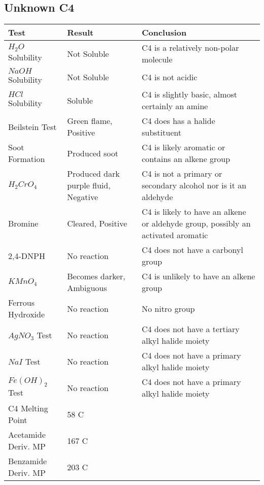 \documentclass[11pt]{article}
\begin{document}
	\subsection{Unknown C4}
	\begin{table}[h]
		\raggedright
		\begin{tabular}{ l  p{3.0cm} p{5.4cm} } 
			\toprule
			\textbf{Test} & \textbf{Result} & \textbf{Conclusion} \\\midrule
			
			$H_2O$ Solubility & Not Soluble & C4 is a relatively non-polar molecule \\\hline
			
			$NaOH$ Solubility & Not Soluble & C4 is not acidic \\\hline
			
			$HCl$ Solubility & Soluble & C4 is slightly basic, almost certainly an amine \\\hline
			
			Beilstein Test & Green flame, Positive & C4 does has a halide substituent \\\hline
			
			Soot Formation & Produced soot & C4 is likely aromatic or contains an alkene group \\\hline
			
			$H_2CrO_4$ & Produced dark purple fluid, Negative & C4 is not a primary or secondary alcohol nor is it an aldehyde \\\hline
			
			Bromine & Cleared, Positive & C4 is likely to have an alkene or aldehyde group, possibly an activated aromatic \\\hline 
			
			2,4-DNPH & No reaction & C4 does not have a carbonyl group \\\hline 
			
			$KMnO_4$ & Becomes darker, Ambiguous & C4 is unlikely to have an alkene group \\\hline  
			
			Ferrous Hydroxide & No reaction & No nitro group \\\hline
			
			$AgNO_3$ Test & No reaction & C4 does not have a tertiary alkyl halide moiety \\\hline 
			
			$NaI$ Test & No reaction & C4 does not have a primary alkyl halide moiety \\\hline 
			
			$Fe(OH)_2$ Test & No reaction & C4 does not have a primary alkyl halide moiety \\\hline
			
			C4 Melting Point & 58 C &  \\\hline
			
			Acetamide Deriv. MP & 167 C &  \\\hline
			
			Benzamide Deriv. MP & 203 C &  \\\hline
			
		\end{tabular}
	\end{table}
	\pagebreak
\end{document}
